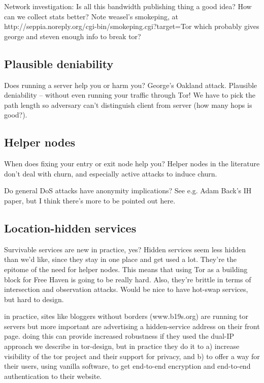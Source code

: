 \documentclass{llncs}
\begin{document}
Network investigation: Is all this bandwidth publishing thing a good idea?
How can we collect stats better? Note weasel's smokeping, at
http://seppia.noreply.org/cgi-bin/smokeping.cgi?target=Tor
which probably gives george and steven enough info to break tor?

\subsection{Plausible deniability}

Does running a server help you or harm you? George's Oakland attack.
Plausible deniability -- without even running your traffic through Tor! We
have to pick the path length so adversary can't distinguish client from
server (how many hops is good?).

\subsection{Helper nodes}

When does fixing your entry or exit node help you?
Helper nodes in the literature don't deal with churn, and
especially active attacks to induce churn.

Do general DoS attacks have anonymity implications? See e.g. Adam
Back's IH paper, but I think there's more to be pointed out here.

\subsection{Location-hidden services}

Survivable services are new in practice, yes? Hidden services seem
less hidden than we'd like, since they stay in one place and get used
a lot. They're the epitome of the need for helper nodes. This means
that using Tor as a building block for Free Haven is going to be really
hard. Also, they're brittle in terms of intersection and observation
attacks. Would be nice to have hot-swap services, but hard to design.

in practice, sites like bloggers without borders (www.b19s.org) are
running tor servers but more important are advertising a hidden-service
address on their front page. doing this can provide increased robustness
if they used the dual-IP approach we describe in tor-design, but in
practice they do it to a) increase visibility of the tor project and their
support for privacy, and b) to offer a way for their users, using vanilla
software, to get end-to-end encryption and end-to-end authentication to
their website.
\end{document}
